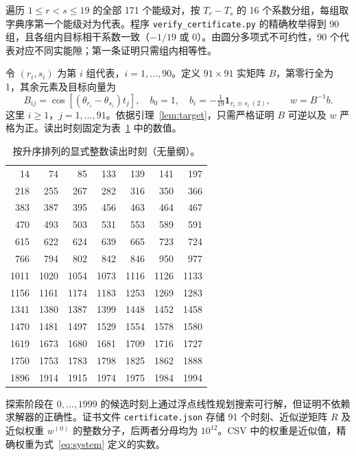 \documentclass[11pt,a4paper]{article}
\begin{document}
遍历 $1\le r<s\le19$ 的全部 171 个能级对，按 $T_r-T_s$ 的 16 个系数分组，每组取字典序第一个能级对为代表。程序 \texttt{verify\_certificate.py} 的精确枚举得到 90 组，且各组内目标相干系数一致（$-1/19$ 或 0）。由圆分多项式不可约性，90 个代表对应不同实能隙；第一条证明只需组内相等性。

令 $(r_i,s_i)$ 为第 $i$ 组代表，$i=1,\ldots,90$。定义 $91\times91$ 实矩阵 $B$，第零行全为 1，其余元素及目标向量为
\begin{equation}\label{eq:system}
B_{ij}=\cos[(\theta_{r_i}-\theta_{s_i})t_j],\quad b_0=1,\quad b_i=-\tfrac1{19}\mathbf1_{r_i\equiv s_i\ (2)},\qquad w=B^{-1}b.
\end{equation}
这里 $i\ge1$，$j=1,\ldots,91$。依据引理~\ref{lem:target}，只需严格证明 $B$ 可逆以及 $w$ 严格为正。读出时刻固定为表~\ref{tab:times} 中的数值。
\begin{table}[htbp]\centering\small
\caption{按升序排列的显式整数读出时刻（无量纲）。}\label{tab:times}
\begin{tabular}{rrrrrrr}\toprule
14 & 74 & 85 & 133 & 139 & 141 & 197 \\
218 & 255 & 267 & 282 & 316 & 350 & 366 \\
383 & 387 & 395 & 456 & 463 & 464 & 467 \\
470 & 493 & 503 & 531 & 553 & 589 & 591 \\
615 & 622 & 624 & 639 & 665 & 723 & 724 \\
766 & 794 & 802 & 842 & 846 & 950 & 977 \\
1011 & 1020 & 1054 & 1073 & 1116 & 1126 & 1133 \\
1156 & 1161 & 1174 & 1183 & 1253 & 1269 & 1283 \\
1341 & 1380 & 1387 & 1399 & 1448 & 1452 & 1458 \\
1470 & 1481 & 1497 & 1529 & 1554 & 1578 & 1580 \\
1619 & 1673 & 1680 & 1681 & 1709 & 1716 & 1727 \\
1750 & 1753 & 1783 & 1798 & 1825 & 1862 & 1888 \\
1896 & 1914 & 1915 & 1974 & 1975 & 1984 & 1994 \\
\bottomrule\end{tabular}\end{table}

探索阶段在 $0,\ldots,1999$ 的候选时刻上通过浮点线性规划搜索可行解，但证明不依赖求解器的正确性。证书文件 \texttt{certificate.json} 存储 91 个时刻、近似逆矩阵 $R$ 及近似权重 $w^{(0)}$ 的整数分子，后两者分母均为 $10^{12}$。CSV 中的权重是近似值，精确权重为式~\eqref{eq:system} 定义的实数。
\end{document}
